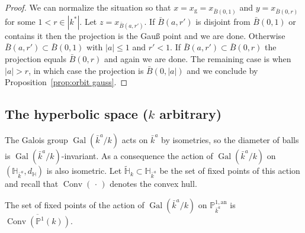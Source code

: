 \documentclass[AHL,Unicode,longabstracts]{cedram}
\DeclareMathOperator{\Gal}{Gal}
\DeclareMathOperator{\conv}{Conv}
\newcommand{\hh}{\mathbb{H}}
\newcommand{\an}{\mathrm{an}}
\newcommand{\abs}[1]{\left\vert#1\right\vert}
\newcommand{\PP}{\mathbb{P}}
\begin{document}
\begin{proof}
We can normalize the situation so that $x = x_{\mathrm{g}} = x_{\bar B(0,1)}$ and $y = x_{\bar B(0,r)}$ for some $1<r\in |k^*|$. Let $z = x_{\bar B(a, r')}$. If $\bar B(a, r')$ is disjoint from $\bar B(0,1)$ or contains it then the projection is the Gau{\ss} point and we are done. Otherwise $\bar B(a, r') \subset \bar B(0,1)$ with $\abs{a}\leq 1$ and $r'<1$. If $\bar B(a, r') \subset \bar B(0,r)$ the projection equals $\bar B(0,r)$ and again we are done. The remaining case is when $\abs{a} >r $, in which case the projection is $\bar B(0,\abs{a})$ and we conclude by Proposition~\ref{prop:orbit gauss}.
\end{proof}

\subsection{The hyperbolic space (\texorpdfstring{$k$}{k} arbitrary)} \label{subs:hyperbolic arbitrary}

The Galois group $\Gal(\bar{k}^a/k)$ acts on $\bar{k}^a$ by isometries, so the diameter of balls is $\Gal(\bar{k}^a/k)$-invariant. As a consequence the action of $\Gal(\bar{k}^a/k)$ on $(\hh_{\bar{k}^a},d_\hh)$ is also isometric. Let $\widetilde{\hh}_k\subset\hh_{\bar{k}^a}$ be the set of fixed points of this action and recall that $\conv({\,\cdot\,})$ denotes the convex hull.

\begin{lemm}\label{lem:fixx}
The set of fixed points of the action of $\Gal(\bar{k}^a/k)$ on $\PP^{1,\an}_{\bar{k}^a}$ is $\overline{\conv(\PP^1(k))}$.
\end{lemm}
\end{document}
